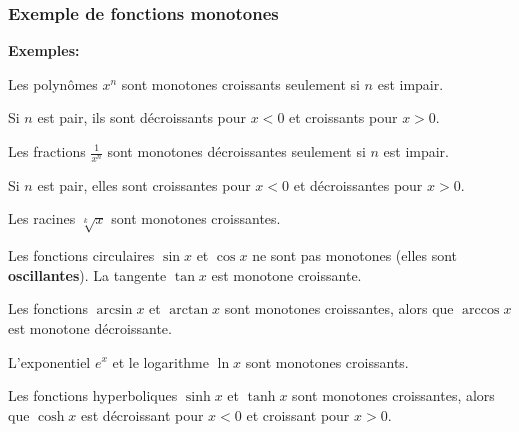 \documentclass[10pt]{beamer}
\newcommand{\bitem}{\item[$\bullet$]}
\begin{document}

\begin{frame}
\frametitle{\bf Exemple de fonctions monotones}
\medskip 

{\small 
{\bf Exemples:}
\begin{itemize}
\bitem
Les polyn\^omes $x^n$ sont monotones croissants seulement si $n$ 
est impair. 
\vspace*{1mm}

Si $n$ est pair, ils sont d\'ecroissants pour $x<0$ et croissants pour $x>0$.  
\vspace*{1mm}

\parbox{10cm}{
\bitem
Les fractions $\frac{1}{x^n}$ sont monotones d\'ecroissantes seulement 
si $n$ est impair. 
\vspace*{1mm}

Si $n$ est pair, elles sont croissantes pour $x<0$ et d\'ecroissantes 
pour $x>0$.}
\vspace*{1mm}

\bitem
Les racines $\sqrt[k]{x}$ sont monotones croissantes. 
\vspace*{1mm}

\bitem
Les fonctions circulaires $\sin x$ et $\cos x$ ne sont pas monotones 
(elles sont {\bf oscillantes}).
La tangente $\tan x$ est monotone croissante. 
\vspace*{1mm}

\bitem
Les fonctions $\arcsin x$ et $\arctan x$ sont monotones croissantes, 
alors que $\arccos x$ est monotone d\'ecroissante. 
\vspace*{1mm}

\bitem
L'exponentiel $e^x$ et le logarithme $\ln x$ sont monotones croissants. 
\vspace*{1mm}

\bitem
Les fonctions hyperboliques $\sinh x$ et $\tanh x$ sont monotones 
croissantes, alors que $\cosh x$ est d\'ecroissant pour $x<0$ et 
croissant pour $x>0$. 
\end{itemize} 

}

\end{frame}

\end{document}
